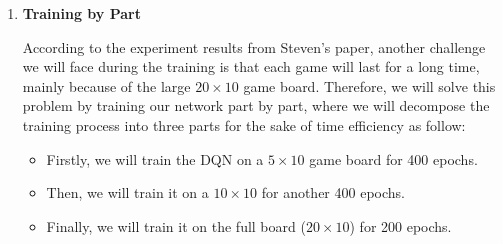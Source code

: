 \documentclass[letterpaper]{article} %
\makeatletter
\newcommand{\removelatexerror}{\let\@latex@error\@gobble}
\makeatother
\begin{document}
\begin{itemize}
\begin{enumerate}
    \begin{figure}[h!]
      \centering
      \begin{minipage}{.95\linewidth}
        \removelatexerror%
        \begin{algorithm}[H]
          \DontPrintSemicolon
        \end{algorithm}
      \end{minipage}
      \caption{Pseudo-code for Training with $\epsilon$-greedy}
      \label{fig:code2}
    \end{figure}

Note that we need a describes $\epsilon$ because we want to explore more in the beginning (in our case, we will use $\epsilon=0.5$), and as we approach the end of the training phase, we want to exploit more (which means $\delta = \frac{\epsilon}{\text{\# of training}} = \frac{0.5}{1000} = 0.0005$).\footnote{This gives two extra hyperparameters that need to be adjusted.}

    \item {\bf Training by Part}

    According to the experiment results from Steven's paper, another challenge we will face during the training is that each game will last for a long time, mainly because of the large $20\times 10$ game board. Therefore, we will solve this problem by training our network part by part, where we will decompose the training process into three parts for the sake of time efficiency as follow:
    \begin{itemize}
      \item 
      Firstly, we will train the DQN on a $5\times 10$ game board for 400 epochs.
      \item 
      Then, we will train it on a $10\times 10$ for another 400 epochs.
      \item 
      Finally, we will train it on the full board ($20\times 10$) for 200 epochs.
    \end{itemize}


\end{enumerate}
\end{itemize}
\end{document}
